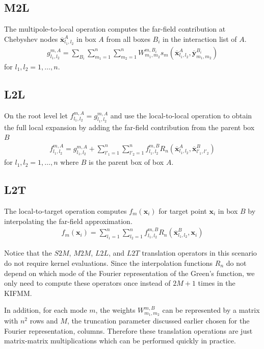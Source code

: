 \documentclass[11pt, oneside]{article}   	%
\begin{document}
\subsection{M2L}
The multipole-to-local operation computes the far-field contribution at Chebyshev nodes $\mathbf{\overline{x}}_{l_1,l_2}^A$ in box $A$ from all boxes $B_i$ in the interaction list of $A$.
\begin{align}
g_{l_1,l_2}^{m,A} = \sum_{B_i} \sum_{m_1=1}^n\sum_{m_2=1}^n W_{m_1,m_2}^{m,B_i} s_m(\mathbf{\overline{x}}^{A}_{l_1,l_2},\mathbf{\overline{y}}^{B_i}_{m_1,m_2})
\end{align}
for $l_1,l_2 = 1,\dots,n$.
\subsection{L2L}
On the root level let $f^{m,A}_{l_1,l_2}=g^{m,A}_{l_1,l_2}$ and use the local-to-local operation to obtain the full local expansion by adding the far-field contribution from the parent box $B$
\begin{align}
f^{m,A}_{l_1,l_2}=g^{m,A}_{l_1,l_2} + \sum_{l'_1=1}^n \sum_{l'_2=1}^n f^{m,B}_{l_1,l_2} R_n(\mathbf{\overline{x}}_{l_1,l_2}^A,\mathbf{\overline{x}}_{l'_1,l'_2}^B)
\end{align}
for $l_1,l_2 = 1,\dots,n$ where $B$ is the parent box of box $A$.
\subsection{L2T}
The local-to-target operation computes $f_m(\mathbf{x}_i)$ for target point $\mathbf{x}_i$ in box $B$ by interpolating the far-field approximation.
\begin{align}
f_m(\mathbf{x}_i)=\sum_{l_1=1}^n \sum_{l_2=1}^n f^{m,B}_{l_1,l_2} R_n(\mathbf{\overline{x}}_{l_1,l_2}^B,\mathbf{x}_i)
\end{align}

Notice that the $S2M$, $M2M$, $L2L$, and $L2T$ translation operators in this scenario do not require kernel evaluations. Since the interpolation functions $R_n$ do not depend on which mode of the Fourier representation of the Green's function, we only need to compute these operators once instead of $2M+1$ times in the KIFMM.

In addition, for each mode $m$, the weights $W^{m,B}_{m_1,m_2}$ can be represented by a matrix with $n^2$ rows and $M$, the truncation parameter discussed earlier chosen for the Fourier representation, columns. Therefore these translation operations are just matrix-matrix multiplications which can be performed quickly in practice.
\end{document}
